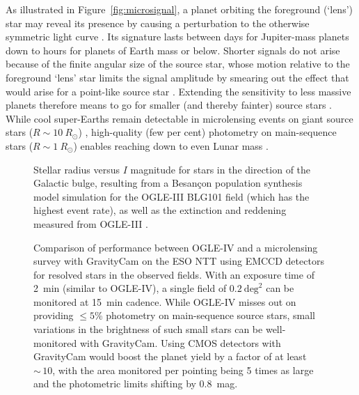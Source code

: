 \documentclass{pasa}%
\begin{document}
As illustrated in Figure~\ref{fig:microsignal}, a planet orbiting the foreground (`lens') star may reveal its presence by causing a perturbation to the otherwise symmetric light curve \citep{MaoPac1991,GouLoe1992}. Its signature lasts between days for Jupiter-mass planets down to hours for planets of Earth mass or below. Shorter signals do not arise because of the finite angular size of the source star, whose motion relative to the foreground `lens' star limits the signal amplitude by smearing out the effect that would arise for a point-like source star \citep{BenRhi1996,Dominik2010}. Extending the sensitivity to less massive planets therefore means to go for smaller (and thereby fainter) source stars \citep{BenRhi2002}. While cool super-Earths remain detectable in microlensing events on giant source stars ($R \sim 10~R_\odot$) \citep{Bea+2006}, high-quality (few per cent) photometry on main-sequence stars ($R \sim 1~R_\odot$) enables reaching down to even Lunar mass \citep{Pac1996,Dominik+2007}.

\begin{figure}
\centering
{}
\caption{Stellar radius versus $I$ magnitude for stars in the direction of the Galactic bulge, resulting from a Besan\c{c}on population synthesis model \citep{Robin+2003} simulation for the OGLE-III BLG101 field (which has the highest event rate), as well as the extinction and reddening measured from OGLE-III \citep{Nataf+2013}.}
\label{fig:Besancon}
\end{figure}

\begin{figure*}
\centering
{}
\caption{Comparison of performance between OGLE-IV and a microlensing survey with \mbox{GravityCam} on the ESO NTT using EMCCD detectors for resolved stars in the observed fields. With an exposure time of 2~min (similar to OGLE-IV), a single field of $0.2~\mbox{deg}^2$ can be monitored at 15~min cadence. While OGLE-IV misses out on providing $\leq 5$\% photometry on main-sequence source stars, small variations in the brightness of such small stars can be well-monitored with \mbox{GravityCam}. Using CMOS detectors with GravityCam would boost the planet yield by a factor of at least $\sim\,10$, with the area monitored per pointing being 5 times as large and the photometric limits shifting by 0.8~\mbox{mag}.}
\label{fig:OGLE_vs_GravityCam}
\end{figure*}
\end{document}
